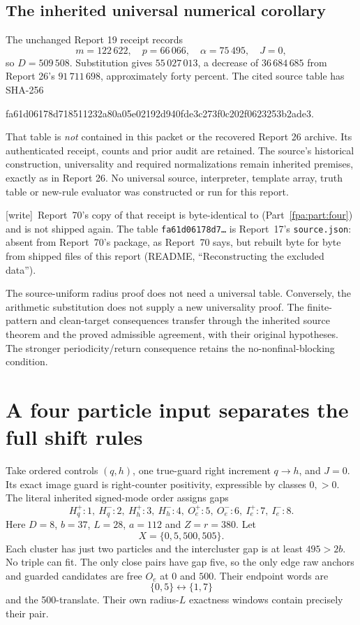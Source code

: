 \documentclass[11pt,a4paper]{article}
\numberwithin{equation}{section}
\newcommand{\code}[1]{\texttt{\small #1}}
\newcommand{\wtag}{\textup{[write]}}
\begin{document}
\subsection{The inherited universal numerical corollary}
The unchanged Report 19 receipt records
\[
m=122\,622,\quad p=66\,066,\quad\alpha=75\,495,\quad J=0,
\]
so $D=509\,508$. Substitution gives $55\,027\,013$, a decrease of $36\,684\,685$ from Report 26's $91\,711\,698$, approximately forty percent. The cited source table has SHA-256
\begin{center}\footnotesize\ttfamily
fa61d06178d718511232a80a05e02192d940fde3c273f0c202f0623253b2ade3.
\end{center}
That table is \emph{not} contained in this packet or the recovered Report 26 archive. Its authenticated receipt, counts and prior audit are retained. The source's historical construction, universality and required normalizations remain inherited premises, exactly as in Report 26. No universal source, interpreter, template array, truth table or new-rule evaluator was constructed or run for this report.

\wtag\ Report~70's copy of that receipt is byte-identical to  (Part~\ref{fpa:part:four}) and is not shipped again. The table \texttt{fa61d06178d7\ldots} is Report~17's \code{source.json}: absent from Report~70's package, as Report~70 says, but rebuilt byte for byte from shipped files of this report (README, ``Reconstructing the excluded data'').

The source-uniform radius proof does not need a universal table. Conversely, the arithmetic substitution does not supply a new universality proof. The finite-pattern and clean-target consequences transfer through the inherited source theorem and the proved admissible agreement, with their original hypotheses. The stronger periodicity/return consequence retains the no-nonfinal-blocking condition.

\section{A four particle input separates the full shift rules}\label{fpa:tr:sec:witness}
Take ordered controls $(q,h)$, one true-guard right increment $q\to h$, and $J=0$. Its exact image guard is right-counter positivity, expressible by classes $0,>0$. The literal inherited signed-mode order assigns gaps
\[
H_q^+:1,\ H_q^-:2,\ H_h^+:3,\ H_h^-:4,\
O_e^+:5,\ O_e^-:6,\ I_e^+:7,\ I_e^-:8.
\]
Here $D=8$, $b=37$, $L=28$, $a=112$ and $Z=r=380$. Let
\[
X=\{0,5,500,505\}.
\]
Each cluster has just two particles and the intercluster gap is at least $495>2b$. No triple can fit. The only close pairs have gap five, so the only edge raw anchors and guarded candidates are free $O_e$ at $0$ and $500$. Their endpoint words are
\[
\{0,5\}\longleftrightarrow\{1,7\}
\]
and the 500-translate. Their own radius-$L$ exactness windows contain precisely their pair.
\end{document}
